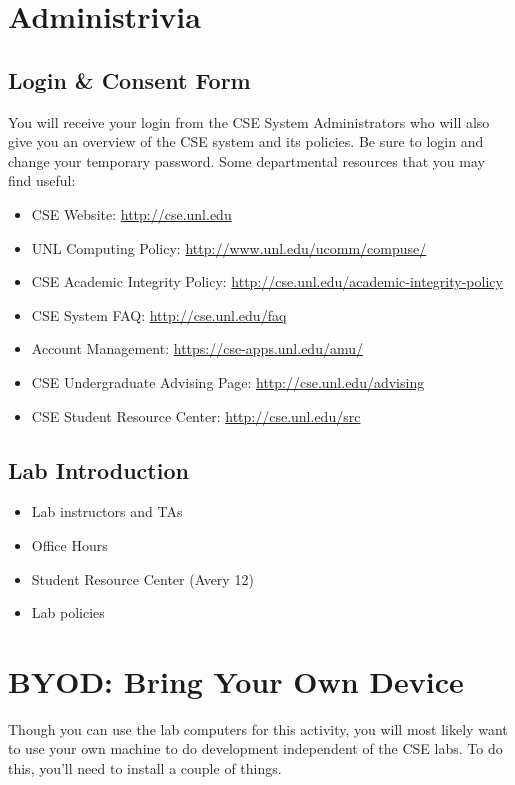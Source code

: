 \documentclass[12pt]{scrartcl}
\begin{document}
\section{Administrivia}

\subsection{Login \& Consent Form}

You will receive your login from the CSE System Administrators who will also 
give you an overview of the CSE system and its policies.  Be sure to login and 
change your temporary password.  Some departmental resources that you may
find useful:
\begin{itemize}
  \item CSE Website: \url{http://cse.unl.edu}
  \item UNL Computing Policy: \url{http://www.unl.edu/ucomm/compuse/}
   \item CSE Academic Integrity Policy: \url{http://cse.unl.edu/academic-integrity-policy}
   \item CSE System FAQ: \url{http://cse.unl.edu/faq}
   \item Account Management: \url{https://cse-apps.unl.edu/amu/}
   \item CSE Undergraduate Advising Page: \url{http://cse.unl.edu/advising}
   \item CSE Student Resource Center: \url{http://cse.unl.edu/src}
\end{itemize}

\subsection{Lab Introduction}

\begin{itemize}
  \item Lab instructors and TAs
  \item Office Hours
  \item Student Resource Center (Avery 12)
  \item Lab policies
\end{itemize}

\section{BYOD: Bring Your Own Device}

Though you can use the lab computers for this activity, you will
most likely want to use your own machine to do development independent
of the CSE labs.  To do this, you'll need to install a couple of
things.
\end{document}
